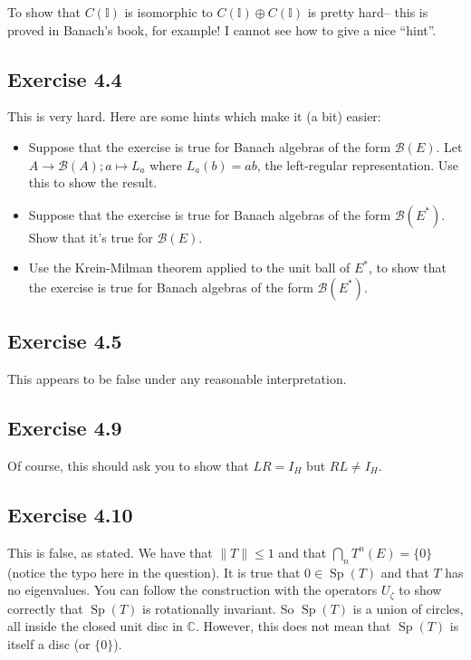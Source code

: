 \documentclass[twoside,12pt,a4paper]{article}
\theoremstyle{plain}
\theoremstyle{definition}
\newcommand{\Sp}{\operatorname{Sp}}
\begin{document}
To show that $C(\mathbb I)$ is isomorphic to $C(\mathbb I)\oplus C(\mathbb I)$
is pretty hard-- this is proved in Banach's book, for example!  I cannot
see how to give a nice ``hint''.


\subsection{Exercise 4.4}

This is very hard.  Here are some hints which make it (a bit) easier:
\begin{itemize}
\item Suppose that the exercise is true for Banach algebras of the
form $\mathcal B(E)$.  Let $A\rightarrow\mathcal B(A); a\mapsto L_a$ where
$L_a(b)=ab$, the left-regular representation.  Use this to show the result.
\item Suppose that  the exercise is true for Banach algebras of the
form $\mathcal B(E^*)$.  Show that it's true for $\mathcal B(E)$.
\item Use the Krein-Milman theorem applied to the unit ball of $E^*$,
to show that the exercise is true for Banach algebras of the
form $\mathcal B(E^*)$.
\end{itemize}


\subsection{Exercise 4.5}

This appears to be false under any reasonable interpretation.


\subsection{Exercise 4.9}

Of course, this should ask you to show that $LR=I_H$ but $RL\not=I_H$.


\subsection{Exercise 4.10}

This is false, as stated.  We have that $\|T\|\leq 1$ and that
$\bigcap_n T^n(E) = \{0\}$ (notice the typo here in the question).
It is true that $0\in\Sp(T)$ and that $T$ has no eigenvalues.  You can
follow the construction with the operators $U_\zeta$ to show correctly
that $\Sp(T)$ is rotationally invariant.  So $\Sp(T)$ is a union of
circles, all inside the closed unit disc in $\mathbb C$.  However, this
does not mean that $\Sp(T)$ is itself a disc (or $\{0\}$).
\end{document}
